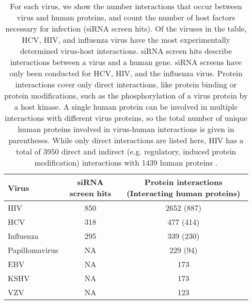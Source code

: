 \begin{table}\footnotesize
\begin{center}
  \begin{tabular}{|l|c|c|}
  \hline
  Virus & siRNA screen hits & Protein interactions (Interacting human proteins) \\
  \hline
HIV & 850 & 2652 (887) \\
HCV & 318 & 477 (414) \\
Influenza & 295 & 339 (230) \\
Papillomavirus & NA & 229 (94) \\
EBV & NA & 173 \\
KSHV & NA & 173 \\
VZV & NA & 123 \\
\hline
  \end{tabular}
\end{center}
\caption[Experimentally determined virus-host interactions]{\small For
  each virus, we show the number interactions that occur between virus
  and human proteins, and count the number of host factors necessary
  for infection (siRNA screen hits). Of the viruses in the table, HCV,
  HIV, and influenza virus have the most experimentally determined
  virus-host interactions. siRNA screen hits describe interactions
  between a virus and a human gene. siRNA screens have only been
  conducted for HCV, HIV, and the influenza virus. Protein
  interactions cover only direct interactions, like protein binding or
  protein modifications, such as the phosphorylation of a virus
  protein by a host kinase. A single human protein can be involved in
  multiple interactions with different virus proteins, so the total
  number of unique human proteins involved in virus-human interactions
  is given in parentheses. While only direct interactions are listed
  here, HIV has a total of 3950 direct and indirect (e.g. regulatory,
  induced protein modification) interactions with 1439 human proteins
  \cite{fu09}. \label{tbl:intro:counts}}
\end{table}
